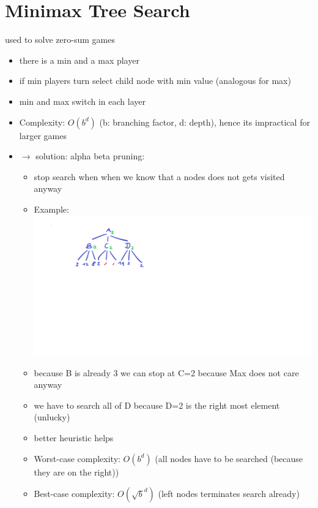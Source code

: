 \documentclass[12pt,a4paper]{article}
\begin{document}
\section{Minimax Tree Search}
used to solve zero-sum games
\begin{itemize}
\setlength\itemsep{0.05cm}
\item there is a min and a max player 
\item if min players turn select child node with min value (analogous for max)
\item min and max switch in each layer 
\item Complexity: $O(b^d)$ (b: branching factor, d: depth), hence its impractical for larger games
\item $\rightarrow$ solution: alpha beta pruning:
\begin{itemize}
\item stop search when when we know that a nodes does not gets visited anyway
\item Example: \\ \includegraphics[scale=0.4]{./resources/ab_search.png}
\item because B is already 3 we can stop at C=2 because Max does not care anyway
\item we have to search all of D because D=2 is the right most element (unlucky) 
\item better heuristic helps
\item Worst-case complexity: $O(b^d)$ (all nodes have to be searched (because they are on the right))
\item Best-case complexity: $O(\sqrt{b}^d)$ (left nodes terminates search already)
\end{itemize}
\end{itemize}
\end{document}
